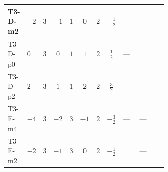 \documentclass[8pt]{article}
\begin{document}
\begin{landscape}
\begin{longtable}{@{}llcccccc >{\raggedright\arraybackslash}p{0.21\linewidth} >{\raggedright\arraybackslash}p{0.21\linewidth} >{\raggedright\arraybackslash}p{0.21\linewidth}@{}}
\midrule
T3-D-m2 & $-2$ & $3$ & $-1$ & $1$ & $0$ & $2$ & $-\frac{1}{2}$ & \scriptsize\adjustbox{max width=\linewidth}{$\begin{gathered} +\frac{3 {g_1}^4}{2}\end{gathered}$} & \scriptsize\adjustbox{max width=\linewidth}{$\begin{gathered} +\frac{{\lambda_{12}^{(1)}}^2}{4}\end{gathered}$} & \scriptsize\adjustbox{max width=\linewidth}{$\begin{gathered} +\frac{{\lambda_{HS_1}^{(1)}}^2}{2}\end{gathered}$} \\
\midrule
T3-D-p0 & $0$ & $3$ & $0$ & $1$ & $1$ & $2$ & $\frac{1}{2}$ & --- & \scriptsize\adjustbox{max width=\linewidth}{$\begin{gathered} +\frac{{\lambda_{12}^{(1)}}^2}{4}\end{gathered}$} & \scriptsize\adjustbox{max width=\linewidth}{$\begin{gathered} +\frac{{\lambda_{HS_1}^{(1)}}^2}{2}\end{gathered}$} \\
\midrule
T3-D-p2 & $2$ & $3$ & $1$ & $1$ & $2$ & $2$ & $\frac{3}{2}$ & \scriptsize\adjustbox{max width=\linewidth}{$\begin{gathered} +\frac{3 {g_1}^4}{2}\end{gathered}$} & \scriptsize\adjustbox{max width=\linewidth}{$\begin{gathered} +\frac{{\lambda_{12}^{(1)}}^2}{4}\end{gathered}$} & \scriptsize\adjustbox{max width=\linewidth}{$\begin{gathered} +\frac{{\lambda_{HS_1}^{(1)}}^2}{2}\end{gathered}$} \\
\midrule
T3-E-m4 & $-4$ & $3$ & $-2$ & $3$ & $-1$ & $2$ & $-\frac{3}{2}$ & --- & --- & \scriptsize\adjustbox{max width=\linewidth}{$\begin{gathered} +\frac{{\lambda_{HS_1}^{(1)}}^2}{2}\end{gathered}$} \\
\midrule
T3-E-m2 & $-2$ & $3$ & $-1$ & $3$ & $0$ & $2$ & $-\frac{1}{2}$ & \scriptsize\adjustbox{max width=\linewidth}{$\begin{gathered} +\frac{3 {g_1}^4}{2}\end{gathered}$} & --- & \scriptsize\adjustbox{max width=\linewidth}{$\begin{gathered} +\frac{{\lambda_{HS_1}^{(1)}}^2}{2}\end{gathered}$} \\

\end{longtable}
\end{landscape}
\end{document}
